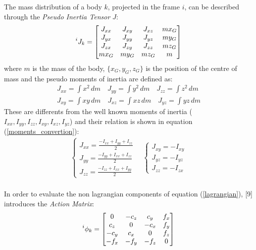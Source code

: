 \documentclass[a4paper,12pt,oneside]{report}
\begin{document}
The mass distribution of a body $k$, projected in the frame $i$, can be described through the \textit{Pseudo Inertia Tensor} $J$:
\begin{equation}
  \prescript{i}{}{J_k}=\begin{bmatrix}
    J_{xx}&J_{xy}&J_{xz}&mx_G\\
    J_{yx}&J_{yy}&J_{yz}&my_G\\
    J_{zx}&J_{zy}&J_{zz}&mz_G\\
    mx_G&my_G&mz_G&m
  \end{bmatrix}
\end{equation}
where $m$ is the mass of the body, $\{x_G,y_G,z_G\}$ is the position of the centre of mass and the pseudo moments of inertia are defined as:
\begin{equation}
  \begin{array}{c}
    J_{xx}=\int x^2\,dm\quad J_{yy}=\int y^2\,dm\quad J_{zz}=\int z^2\,dm\\
    J_{xy}=\int xy\,dm\quad J_{xz}=\int xz\,dm\quad J_{yz}=\int yz\,dm
  \end{array}
  \label{pseudo_moments}
\end{equation}
These are differents from the well known moments of inertia ($I_{xx},I_{yy},I_{zz},I_{xy},I_{xz},I_{yz}$) and their relation is shown in equation (\ref{moments_convertion}):
\begin{equation}
  \begin{array}{c}
    \begin{cases}
      J_{xx}=\frac{-I_{xx}+I_{yy}+I_{zz}}{2}\\
      J_{yy}=\frac{-I_{yy}+I_{xx}+I_{zz}}{2}\\
      J_{zz}=\frac{-I_{zz}+I_{xx}+I_{yy}}{2}
    \end{cases}
    \quad
    \begin{cases}
      J_{xy}=-I_{xy}\\
      J_{yz}=-I_{yz}\\
      J_{zz}=-I_{zx}
    \end{cases}
  \end{array}
\label{moments_convertion}
\end{equation}
\\
In order to evaluate the non lagrangian components of equation (\ref{lagrangian}), [9] introduces the \textit{Action Matrix}:
\begin{equation}
  \prescript{i}{}{\phi}_k=\begin{bmatrix}
    0&-c_z&c_y&f_x\\
    c_z&0&-c_x&f_y\\
    -c_y&c_x&0&f_z\\
    -f_x&-f_y&-f_z&0
  \end{bmatrix}
  \label{action_matrix}
\end{equation}
\end{document}
